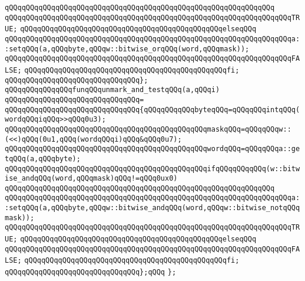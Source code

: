 \verb|qQQqqQQqqQQqqQQqqQQqqQQqqQQqqQQqqQQqqQQqqQQqqQQqqQQqqQQqqQQqqQQq|\newline
\verb|qQQqqQQqqQQqqQQqqQQqqQQqqQQqqQQqqQQqqQQqqQQqqQQqqQQqqQQqqQQqqQQqqQQqTRUE;|\newline
\verb|qQQqqQQqqQQqqQQqqQQqqQQqqQQqqQQqqQQqqQQqqQQqqQQqelseqQQq|\newline
\verb|qQQqqQQqqQQqqQQqqQQqqQQqqQQqqQQqqQQqqQQqqQQqqQQqqQQqqQQqqQQqqQQqqQQqa::setqQQq(a,qQQqbyte,qQQqw::bitwise_orqQQq(word,qQQqmask));|\newline
\verb|qQQqqQQqqQQqqQQqqQQqqQQqqQQqqQQqqQQqqQQqqQQqqQQqqQQqqQQqqQQqqQQqqQQqFALSE;|\newline
\verb|qQQqqQQqqQQqqQQqqQQqqQQqqQQqqQQqqQQqqQQqqQQqqQQqfi;|\newline
\verb|qQQqqQQqqQQqqQQqqQQqqQQqqQQqqQQq};|\newline
\newline
\newline
\verb|qQQqqQQqqQQqqQQqfunqQQqunmark_and_testqQQq(a,qQQqi)|\newline
\verb|qQQqqQQqqQQqqQQqqQQqqQQqqQQqqQQq=|\newline
\verb|qQQqqQQqqQQqqQQqqQQqqQQqqQQqqQQq{qQQqqQQqqQQqbyteqQQq=qQQqqQQqintqQQq(wordqQQqiqQQq>>qQQq0u3);|\newline
\verb|qQQqqQQqqQQqqQQqqQQqqQQqqQQqqQQqqQQqqQQqqQQqqQQqmaskqQQq=qQQqqQQqw::(<<)qQQq(0u1,qQQq(wordqQQqi)qQQq&qQQq0u7);|\newline
\verb|qQQqqQQqqQQqqQQqqQQqqQQqqQQqqQQqqQQqqQQqqQQqqQQqwordqQQq=qQQqqQQqa::getqQQq(a,qQQqbyte);|\newline
\newline
\verb|qQQqqQQqqQQqqQQqqQQqqQQqqQQqqQQqqQQqqQQqqQQqqQQqifqQQqqQQqqQQq(w::bitwise_andqQQq(word,qQQqmask)qQQq!=qQQq0ux0)|\newline
\verb|qQQqqQQqqQQqqQQqqQQqqQQqqQQqqQQqqQQqqQQqqQQqqQQqqQQqqQQqqQQqqQQq|\newline
\verb|qQQqqQQqqQQqqQQqqQQqqQQqqQQqqQQqqQQqqQQqqQQqqQQqqQQqqQQqqQQqqQQqqQQqa::setqQQq(a,qQQqbyte,qQQqw::bitwise_andqQQq(word,qQQqw::bitwise_notqQQqmask));|\newline
\verb|qQQqqQQqqQQqqQQqqQQqqQQqqQQqqQQqqQQqqQQqqQQqqQQqqQQqqQQqqQQqqQQqqQQqTRUE;|\newline
\verb|qQQqqQQqqQQqqQQqqQQqqQQqqQQqqQQqqQQqqQQqqQQqqQQqelseqQQq|\newline
\verb|qQQqqQQqqQQqqQQqqQQqqQQqqQQqqQQqqQQqqQQqqQQqqQQqqQQqqQQqqQQqqQQqqQQqFALSE;|\newline
\verb|qQQqqQQqqQQqqQQqqQQqqQQqqQQqqQQqqQQqqQQqqQQqqQQqfi;|\newline
\verb|qQQqqQQqqQQqqQQqqQQqqQQqqQQqqQQq};qQQq|\newline
\newline
\verb|};|\newline
\newline
\newline

